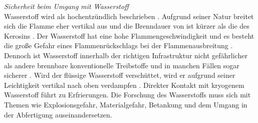 %
%
%
\textit{Sicherheit beim Umgang mit Wasserstoff}\\
Wasserstoff wird als hochentzündlich beschrieben \cite{dalmia2022powering}. Aufgrund seiner Natur breitet sich die Flamme eher 
vertikal aus und die Brenndauer von  ist kürzer als die des Kerosins \cite{colpan2022fuel}.
Der Wasserstoff hat eine hohe Flammengeschwindigkeit und es besteht die große Gefahr eines Flammenrückschlags bei der Flammenausbreitung \cite{khandelwal2013hydrogen}.
Dennoch ist Wasserstoff innerhalb der richtigen Infrastruktur nicht gefährlicher als andere brennbare konventionelle Treibstoffe und in manchen 
Fällen sogar sicherer \cite{khandelwal2013hydrogen}. 
Wird der flüssige Wasserstoff verschüttet, wird er aufgrund seiner Leichtigkeit vertikal nach oben verdampfen \cite{colpan2022fuel}. 
Direkter Kontakt mit kryogenem Wasserstoff führt zu Erfrierungen.
Die Forschung des Wasserstoffs muss sich mit Themen wie Explosionsgefahr, Materialgefahr, Betankung und 
dem Umgang in der Abfertigung auseinandersetzen. 


